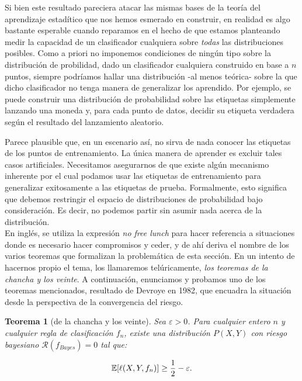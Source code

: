 \documentclass{report}
\newtheorem{thm}{Teorema}[subsection]
\begin{document}
Si bien este resultado pareciera atacar las mismas bases de la teoría del aprendizaje estadítico que nos hemos esmerado en 
construir, en realidad es algo bastante esperable cuando reparamos en el hecho de que estamos planteando
medir la capacidad de un clasificador cualquiera sobre \textit{todas} las distribuciones posibles. Como a priori
no imponemos condiciones de ningún tipo sobre la distribución de probilidad, dado un clasificador cualquiera construido
en base a $n$ puntos, siempre podríamos hallar una distribución -al menos teórica- sobre la que dicho clasificador no tenga
manera de generalizar los aprendido. Por ejemplo, se puede construir una distribución de probabilidad sobre las etiquetas simplemente 
lanzando una moneda y, para cada punto de datos, decidir su etiqueta verdadera según el resultado del 
lanzamiento aleatorio. \newline

Parece plausible que, en un escenario así, no sirva de nada conocer las etiquetas de los puntos de 
entrenamiento. La única manera de aprender es excluir tales casos artificiales. Necesitamos asegurarnos 
de que existe algún mecanismo inherente por el cual podamos usar las etiquetas de entrenamiento para 
generalizar exitosamente a las etiquetas de prueba. Formalmente, esto significa que debemos restringir 
el espacio de distribuciones de probabilidad bajo consideración. Es decir, no podemos partir sin asumir
nada acerca de la distribución.\\

En inglés, se utiliza la expresión \textit{no free lunch} para hacer referencia
a situaciones donde es necesario hacer compromisos y ceder, y de ahí deriva el nombre de los varios teoremas
que formalizan la problemática de esta sección. En un intento de hacernos propio el tema, los llamaremos 
telúricamente, \textit{los teoremas de la chancha y los veinte}. 
A continuación, enunciamos y probamos uno de los teoremas mencionados, resultado de Devroye en 1982, que encuadra la
situación desde la perspectiva de la convergencia del riesgo.\newline


\begin{thm}[de la chancha y los veinte]
Sea \(\varepsilon > 0\). Para cualquier entero \(n\) y cualquier 
regla de clasificación \(f_n\), existe una distribución \(P(X, Y)\) con riesgo bayesiano 
\(\mathcal{R}(f_{Bayes}) = 0\) tal que:

\[
\mathbb{E}[\ell(X,Y,f_n)] \geq \frac{1}{2} - \varepsilon.\newline
\]
\end{thm}
\end{document}
